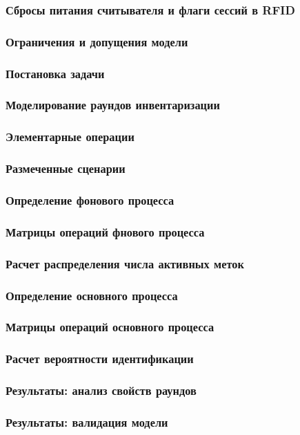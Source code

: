 \begin{frame}
    \frametitle{Сбросы питания считывателя и флаги сессий в RFID}
\end{frame}

\begin{frame}
    \frametitle{Ограничения и допущения модели}
\end{frame}

\begin{frame}
    \frametitle{Постановка задачи}
\end{frame}

\begin{frame}
    \frametitle{Моделирование раундов инвентаризации}
\end{frame}

\begin{frame}
    \frametitle{Элементарные операции}
\end{frame}

\begin{frame}
    \frametitle{Размеченные сценарии}
\end{frame}

\begin{frame}
    \frametitle{Определение фонового процесса}
\end{frame}

\begin{frame}
    \frametitle{Матрицы операций фнового процесса}
\end{frame}

\begin{frame}
    \frametitle{Расчет распределения числа активных меток}
\end{frame}

\begin{frame}
    \frametitle{Определение основного процесса}
\end{frame}

\begin{frame}
    \frametitle{Матрицы операций основного процесса}
\end{frame}

\begin{frame}
    \frametitle{Расчет вероятности идентификации}
\end{frame}

\begin{frame}
    \frametitle{Результаты: анализ свойств раундов}
\end{frame}

\begin{frame}
    \frametitle{Результаты: валидация модели}
\end{frame}

